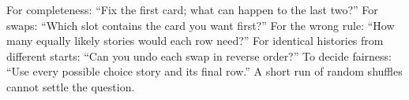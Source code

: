 For completeness: ``Fix the first card; what can happen to the last two?'' For swaps: ``Which slot contains the card you want first?'' For the wrong rule: ``How many equally likely stories would each row need?'' For identical histories from different starts: ``Can you undo each swap in reverse order?'' To decide fairness: ``Use every possible choice story and its final row.'' A short run of random shuffles cannot settle the question.
